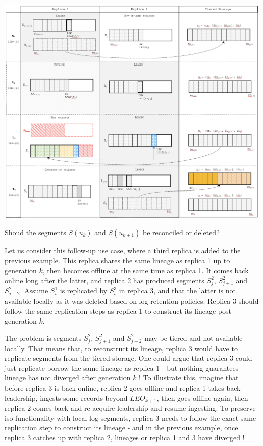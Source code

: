 \documentclass{article}
\begin{document}
\begin{center}
	\includegraphics[scale=0.4]{unclean1.png}
\end{center}

Shoud the segments $S(u_k)$ and $S(u_{k+1})$ be reconciled or deleted? 

Let us consider this follow-up use case, where a third replica is added to the previous example. This replica shares the same lineage as replica 1 up to generation $k$, then becomes offline at the same time as replica 1. It comes back online long after the latter, and replica 2 has produced segments $S_j^2$, $S_{j+1}^2$ and $S_{j+2}^2$. Assume $S_i^1$ is replicated by $S_i^3$ in replica 3, and that the latter is not available locally as it was deleted based on log retention policies. Replica 3 should follow the same replication steps as replica 1 to construct its lineage post-generation $k$.

The problem is segments $S_j^2$, $S_{j+1}^2$ and $S_{j+2}^2$ may be tiered and not available locally. That means that, to reconstruct its lineage, replica 3 would have to replicate segments from the tiered storage. One could argue that replica 3 could just replicate borrow the same lineage as replica 1 - but nothing guarantees lineage has not diverged after generation $k$ ! To illustrate this, imagine that before replica 3 is back online, replica 2 goes offline and replica 1 takes back leadership, ingests some records beyond $LEO_{k+1}$, then goes offline again, then replica 2 comes back and re-acquire leadership and resume ingesting. To preserve iso-functionality with local log segments, replica 3 needs to follow the exact same replication step to construct its lineage - and in the previous example, once replica 3 catches up with replica 2, lineages or replica 1 and 3 have diverged !
\end{document}
